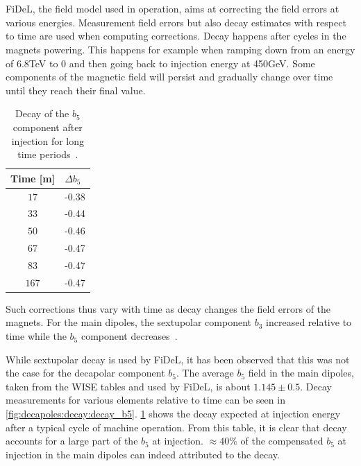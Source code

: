 \section{}

FiDeL, the field model used in operation, aims at correcting the field errors at various energies.
Measurement field errors but also decay estimates with respect to time are used when computing
corrections. Decay happens after cycles in the magnets powering. This happens for example when
ramping down from an energy of 6.8TeV to 0 and then going back to injection energy at 450GeV. Some
components of the magnetic field will persist and gradually change over time until they reach their
final value.


\begin{table}
    \centering
    \begin{tabular}{cl}
        \toprule
        Time [m] & $\Delta b_5$ \\
        \midrule
        $17$    & -0.38 \\ 
        $33$    & -0.44 \\
        $50$    & -0.46 \\
        $67$    & -0.47 \\
        $83$    & -0.47 \\
        $167$   & -0.47 \\
        \bottomrule
    \end{tabular}
    \caption{Decay of the $b_5$ component after injection for long time
    periods~\cite{deniau_magnetic_2009}.}
    \label{table:decapoles:decay:decay_b5}
\end{table}

Such corrections thus vary with time as decay changes the field errors of the magnets.
For the main dipoles, the sextupolar component $b_3$ increased relative to time while the $b_5$
component decreases~\cite{deniau_magnetic_2009}.

While sextupolar decay is used by FiDeL, it has been observed that this was not the case for the
decapolar component $b_5$. The average $b_5$ field in the main dipoles, taken from the WISE tables
and used by FiDeL, is about $1.145 \pm 0.5$. Decay measurements for various elements relative to
time can be seen in \cref{fig:decapoles:decay:decay_b5}.
\cref{table:decapoles:decay:decay_b5} shows the decay expected at injection energy after a typical
cycle of machine operation. From this table, it is clear that decay accounts for a large part of the
$b_5$ at injection. $\approx 40\%$ of the compensated $b_5$ at injection in the main dipoles can
indeed attributed to the decay.

